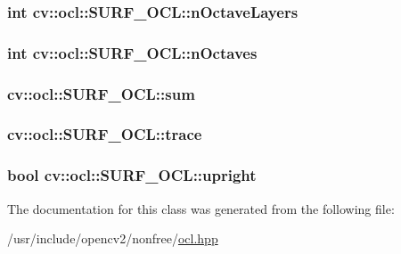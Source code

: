 \hypertarget{classcv_1_1ocl_1_1SURF__OCL_a379bc4a32533ce4aa78f85e210667deb}{
\subsubsection[{n\-Octave\-Layers}]{\setlength{\rightskip}{0pt plus 5cm}int cv\-::ocl\-::\-S\-U\-R\-F\-\_\-\-O\-C\-L\-::n\-Octave\-Layers}}\label{classcv_1_1ocl_1_1SURF__OCL_a379bc4a32533ce4aa78f85e210667deb}
\hypertarget{classcv_1_1ocl_1_1SURF__OCL_a406c2ed99157de3203506c175726c773}{
\subsubsection[{n\-Octaves}]{\setlength{\rightskip}{0pt plus 5cm}int cv\-::ocl\-::\-S\-U\-R\-F\-\_\-\-O\-C\-L\-::n\-Octaves}}\label{classcv_1_1ocl_1_1SURF__OCL_a406c2ed99157de3203506c175726c773}
\hypertarget{classcv_1_1ocl_1_1SURF__OCL_a2e5e88a6e1f212ff74b78cfe9842993b}{
\subsubsection[{sum}]{ cv\-::ocl\-::\-S\-U\-R\-F\-\_\-\-O\-C\-L\-::sum}}\label{classcv_1_1ocl_1_1SURF__OCL_a2e5e88a6e1f212ff74b78cfe9842993b}
\hypertarget{classcv_1_1ocl_1_1SURF__OCL_aef0a9250881cbf6ac305bb7da974a1e7}{
\subsubsection[{trace}]{ cv\-::ocl\-::\-S\-U\-R\-F\-\_\-\-O\-C\-L\-::trace}}\label{classcv_1_1ocl_1_1SURF__OCL_aef0a9250881cbf6ac305bb7da974a1e7}
\hypertarget{classcv_1_1ocl_1_1SURF__OCL_aa2d233892c230bb56c2016b69cb6d492}{
\subsubsection[{upright}]{\setlength{\rightskip}{0pt plus 5cm}bool cv\-::ocl\-::\-S\-U\-R\-F\-\_\-\-O\-C\-L\-::upright}}\label{classcv_1_1ocl_1_1SURF__OCL_aa2d233892c230bb56c2016b69cb6d492}


The documentation for this class was generated from the following file\-:\begin{DoxyCompactItemize}
\item 
/usr/include/opencv2/nonfree/\hyperlink{nonfree_2ocl_8hpp}{ocl.\-hpp}\end{DoxyCompactItemize}
